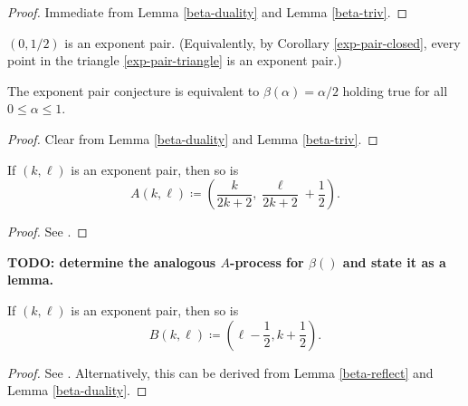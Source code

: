 \begin{proof} Immediate from Lemma \ref{beta-duality} and Lemma \ref{beta-triv}.
\end{proof}

\begin{conjecture}\label{exp-pair-conj}  $(0,1/2)$ is an exponent pair.  (Equivalently, by Corollary \ref{exp-pair-closed}, every point in the triangle \eqref{exp-pair-triangle} is an exponent pair.)
\end{conjecture}



\begin{lemma}\label{exp-pair-conj-beta}  The exponent pair conjecture is equivalent to $\beta(\alpha)=\alpha/2$ holding true for all $0 \leq \alpha \leq 1$.
\end{lemma}

\begin{proof} Clear from Lemma \ref{beta-duality} and Lemma \ref{beta-triv}.
\end{proof}

\begin{proposition}\label{vdc-a}  If $(k,\ell)$ is an exponent pair, then so is
    $$A(k,\ell) \coloneqq \left(\frac{k}{2k+2}, \frac{\ell}{2k+2} + \frac{1}{2}\right).$$
\end{proposition}

\literature
{}

\begin{proof} See \cite[Lemma 2.8]{ivic}.
\end{proof}

{\bf TODO: determine the analogous $A$-process for $\beta()$ and state it as a lemma.}

\begin{proposition}\label{vdc-b}  If $(k,\ell)$ is an exponent pair, then so is
    $$B(k,\ell) \coloneqq \left(\ell-\frac{1}{2}, k+\frac{1}{2}\right).$$
\end{proposition}

\literature
{}

\begin{proof}  See \cite[Lemma 2.9]{ivic}.  Alternatively, this can be derived from Lemma \ref{beta-reflect} and Lemma \ref{beta-duality}.
\end{proof}


